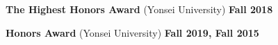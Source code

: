 \vspace*{10pt}
\textbf{The Highest Honors Award} (Yonsei University) \hfill \textbf{Fall 2018}

\vspace*{6pt}
\textbf{Honors Award} (Yonsei University) \hfill \textbf{Fall 2019, Fall 2015}



